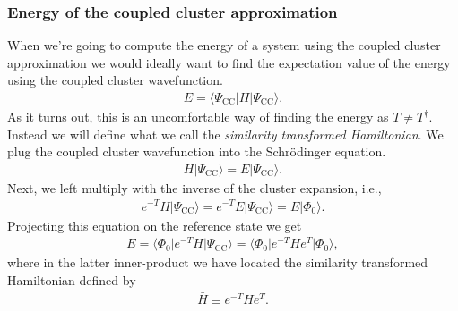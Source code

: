 \documentclass[
    a4paper, aps, twocolumn, floatfix, superscriptaddress,
    nofootinbib]{revtex4-1}
\newcommand{\1}{\mathds{1}}
\newcommand{\bra}[1]{\langle #1\lvert}
\newcommand{\ket}[1]{\rvert #1\rangle}
\newcommand{\kslat}{\ket{\Phi_0}}
\newcommand{\bslat}{\bra{\Phi_0}}
\newcommand{\kcc}{\ket{\Psi_{\text{CC}}}}
\newcommand{\bcc}{\bra{\Psi_{\text{CC}}}}
\begin{document}
        \subsubsection{Energy of the coupled cluster approximation}
            When we're going to compute the energy of a system using the coupled
            cluster approximation we would ideally want to find the expectation
            value of the energy using the coupled cluster wavefunction.
            \begin{align}
                E = \bcc H\kcc.
            \end{align}
            As it turns out, this is an uncomfortable way of finding the energy
            as $T \neq T^{\dagger}$. Instead we will define what we call the
            \emph{similarity transformed Hamiltonian}. We plug the coupled
            cluster wavefunction into the Schrödinger equation.
            \begin{align}
                H\kcc = E\kcc.
            \end{align}
            Next, we left multiply with the inverse of the cluster expansion,
            i.e.,
            \begin{align}
                e^{-T}H\kcc = e^{-T}E\kcc
                = E \kslat.
            \end{align}
            Projecting this equation on the reference state we get
            \begin{align}
                E = \bslat e^{-T}H\kcc
                = \bslat e^{-T}He^{T}\kslat,
            \end{align}
            where in the latter inner-product we have located the similarity
            transformed Hamiltonian defined by
            \begin{align}
                \bar{H} \equiv e^{-T}He^{T}.
                \label{eq:similarity_transformed_hamiltonian}
            \end{align}


\end{document}
